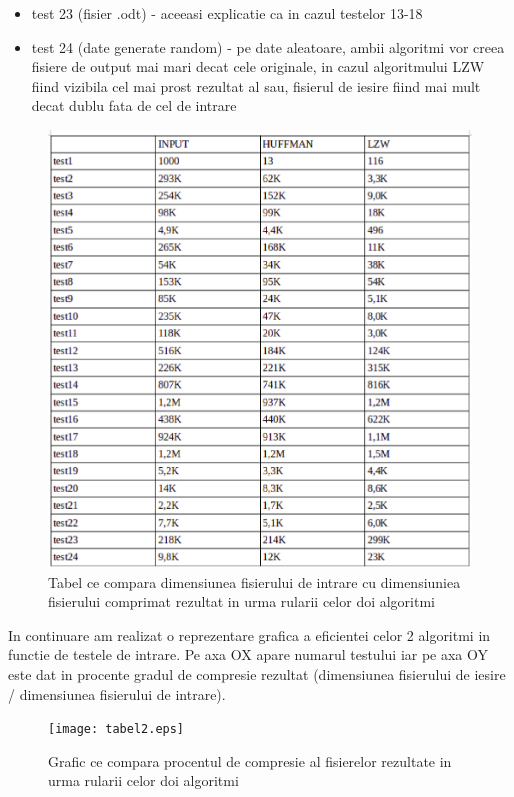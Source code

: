 \documentclass[runningheads]{llncs}
\begin{document}
\begin{itemize}
    \item test 23 (fisier .odt) - aceeasi explicatie ca in cazul testelor 13-18

    \item test 24 (date generate random) - pe date aleatoare, ambii algoritmi vor creea fisiere de output mai mari decat cele originale, in cazul algoritmului LZW fiind
    vizibila cel mai prost rezultat  al sau, fisierul de iesire fiind mai mult decat dublu fata de cel de intrare
\end{itemize}


\begin{figure}
    \includegraphics[width=\textwidth]{tabel3.eps}
    \caption{Tabel ce compara dimensiunea fisierului de intrare cu dimensiuniea fisierului comprimat
    rezultat in urma rularii celor doi algoritmi} \label{fig1}
    \end{figure}

In continuare am realizat o reprezentare grafica a eficientei celor 2 algoritmi in functie de testele de intrare.
Pe axa OX apare numarul testului iar pe axa OY este dat in procente
gradul de compresie rezultat (dimensiunea fisierului de iesire / dimensiunea fisierului de intrare).


\begin{figure}
\texttt{[image: tabel2.eps]}
\caption{Grafic ce compara procentul de compresie al fisierelor rezultate in urma rularii celor doi algoritmi} \label{fig2}
\end{figure}
\end{document}
